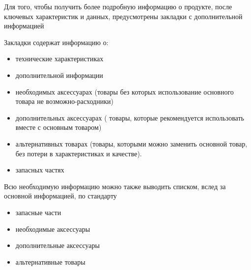 {

\begin{itogolong}
Для того, чтобы получить более подробную информацию о продукте, после ключевых характеристик и данных, предусмотрены закладки с дополнительной информацией

Закладки содержат информацию о:
\begin{itemize}
\item технические характеристиках 
\item дополнительной информации
\item необходимых аксессуарах (товары без которых использование основного товара не возможно-расходники)
\item дополнительных аксессуарах ( товары, которые рекомендуется использовать вместе с основным товаром) 
\item альтернативных товарах (товары, которыми можно заменить основной товар, без потери в характеристиках и качестве). 
\item запасных частях
\end{itemize}

Всю необходимую информацию можно также выводить списком, вслед за основной информацией, по стандарту 
\begin{itemize}
\item запасные части
\item необходимые аксессуары
\item дополнительные аксессуары
\item альтернативные товары
\end{itemize}

\end{itogolong}

}

